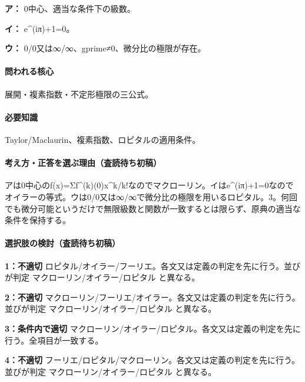\noindent\textbf{ア：} 0中心、適当な条件下の級数。\par

\noindent\textbf{イ：} e\textasciicircum{}(iπ)+1=\allowbreak{}0。\par

\noindent\textbf{ウ：} 0/0又は∞/∞、gprime≠0、微分比の極限が存在。\par

\paragraph{問われる核心} 展開・複素指数・不定形極限の三公式。

\paragraph{必要知識} Taylor/Maclaurin、複素指数、ロピタルの適用条件。

\paragraph{考え方・正答を選ぶ理由（査読待ち初稿）} アは0中心のf(x)=Σf\textasciicircum{}(k)(0)x\textasciicircum{}k/k!なのでマクローリン。イはe\textasciicircum{}(iπ)+1=\allowbreak{}0なのでオイラーの等式。ウは0/0又は∞/∞で微分比の極限を用いるロピタル。3。何回でも微分可能というだけで無限級数と関数が一致するとは限らず、原典の適当な条件を保持する。

\paragraph{選択肢の検討（査読待ち初稿）}\mbox{}\par

\noindent\textbf{1：不適切} ロピタル/オイラー/フーリエ。各文又は定義の判定を先に行う。並びが判定 マクローリン/オイラー/ロピタル と異なる。\par

\noindent\textbf{2：不適切} マクローリン/フーリエ/オイラー。各文又は定義の判定を先に行う。並びが判定 マクローリン/オイラー/ロピタル と異なる。\par

\noindent\textbf{3：条件内で適切} マクローリン/オイラー/ロピタル。各文又は定義の判定を先に行う。全項目が一致する。\par

\noindent\textbf{4：不適切} フーリエ/ロピタル/マクローリン。各文又は定義の判定を先に行う。並びが判定 マクローリン/オイラー/ロピタル と異なる。\par

